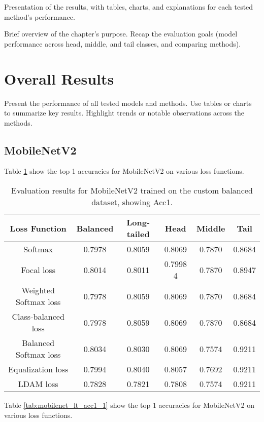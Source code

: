 
Presentation of the results, with tables, charts, and explanations for each tested method's performance.

Brief overview of the chapter’s purpose.
Recap the evaluation goals (model performance across head, middle, and tail classes, and comparing methods).

\section{Overall Results}
Present the performance of all tested models and methods.
Use tables or charts to summarize key results.
Highlight trends or notable observations across the methods.


\subsection{MobileNetV2}
Table \ref{tab:mobilenet_bal_acc1_1} show the top 1 accuracies for MobileNetV2 on various loss functions.

\begin{table}[H]
    \centering
    \begin{tabular}{cccccc}
        \toprule
        Loss Function & Balanced & Long-tailed & Head & Middle & Tail \\ 
        \midrule
        Softmax   & 0.7978   & 0.8059 & 0.8069 & 0.7870 & 0.8684 \\
        Focal loss   & 0.8014   & 0.8011 & 0.7998 4 & 0.7870 & 0.8947 \\
        Weighted Softmax loss   & 0.7978   & 0.8059 & 0.8069 & 0.7870 & 0.8684 \\
        Class-balanced loss   & 0.7978   & 0.8059 & 0.8069 & 0.7870 & 0.8684 \\
        Balanced Softmax loss   & 0.8034  & 0.8030 & 0.8069 & 0.7574 & 0.9211 \\
        Equalization loss   & 0.7994   & 0.8040 & 0.8057 & 0.7692 & 0.9211 \\
        LDAM loss   &  0.7828   & 0.7821 & 0.7808 & 0.7574 & 0.9211 \\
        \bottomrule
    \end{tabular}
    \caption{Evaluation results for MobileNetV2 trained on the custom balanced dataset, showing Acc1.}
    \label{tab:mobilenet_bal_acc1_1}
\end{table}

Table \ref{tab:mobilenet_lt_acc1_1} show the top 1 accuracies for MobileNetV2 on various loss functions.

